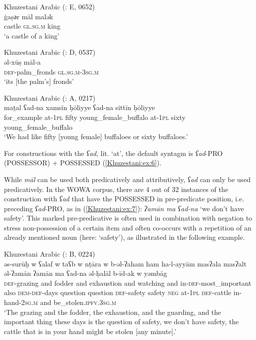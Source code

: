 \documentclass[output=paper,colorlinks,citecolor=brown,draftmode]{langscibook}
\begin{document}
\ea\label{Khuzestani:ex:4}
Khuzestani Arabic (\citealt{leitnerArabic2021}: E, 0652) \\
\gll ġaṣәr māl malək \\
castle \textsc{gl.sg.m} king \\
\glt `a castle of a king' 
\z

\ea\label{Khuzestani:ex:5}
Khuzestani Arabic (\citealt{leitnerArabic2021}: D, 0537) \\
\gll əl-xūṣ māl-a \\
\textsc{def-}palm\_fronds \textsc{gl.sg.m-3sg.m} \\
\glt `its [the palm's] fronds'
\z

\ea\label{Khuzestani:ex:6}
Khuzestani Arabic (\citealt{leitnerArabic2021}: A, 0217) \\
\gll maṯal ʕad-na xamsīn ḥōliyye ʕad-na sittīn ḥōliyye \\
for\_example at\textsc{-1pl} fifty young\_female\_buffalo at\textsc{-1pl} sixty young\_female\_buffalo \\
\glt `We had like fifty [young female] buffaloes or sixty buffaloes.' 
\z

For  constructions with the  \textit{ʕad}, lit. `at', the default syntagm is \textit{ʕad}-PRO (POSSESSOR) + POSSESSED (\ref{Khuzestani:ex:6}). 

While \textit{māl} can be used both predicatively and attributively, \textit{ʕad} can only be used predicatively. In the WOWA corpus, there are 4 out of 32 instances of the  construction with \textit{ʕad} that have the POSSESSED in pre-predicate position, i.e. preceding \textit{ʕad}-PRO, as in (\ref{Khuzestani:ex:7}): \textit{ʔamān ma ʕad-na} `we don't have safety'. This marked pre-predicative  is often used in combination with negation to stress non-possession of a certain item and often co-occurs with a repetition of an already mentioned noun (here: `safety'), as illustrated in the following example. 

\ea\label{Khuzestani:ex:7}
Khuzestani Arabic (\citealt{leitnerArabic2021}: B, 0224) \\
\gll əs-surūḥ w ʕalaf w taʕb w nṭāra w b-əl-ʔaham ham ha-l-ayyām masʔala masʔalt əl-ʔamān ʔamān ma ʕad-na əl-ḥalāl b-īd-ak w yəmbāg \\
\textsc{def-}grazing and fodder and exhaustion and watching and in\textsc{-def-}most\_important also \textsc{dem-def-}days question question \textsc{def-}safety safety \textsc{neg} at\textsc{-1pl} \textsc{def-}cattle in-hand\textsc{-2sg.m} and be\_stolen\textsc{.ipfv.3sg.m} \\
\glt `The grazing and the fodder, the exhaustion, and the guarding, and the important thing these days is the question of safety, we don't have safety, the cattle that is in your hand might be stolen [any minute].' 
\z
\end{document}

